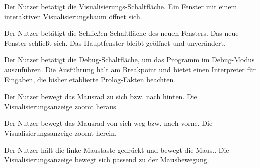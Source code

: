 \documentclass[parskip=full,11pt,twoside]{scrartcl}
\begin{document}


{Der Nutzer betätigt die Visualisierungs-Schaltfläche.}
{Ein Fenster mit einem interaktiven Visualisierungsbaum öffnet sich.}

{Der Nutzer betätigt die Schließen-Schaltfläche des neuen Fensters.}
{Das neue Fenster schließt sich. Das Hauptfenster bleibt geöffnet und unverändert.}




{Der Nutzer betätigt die Debug-Schaltfläche, um das Programm im Debug-Modus auszuführen.}
{Die Ausführung hält am Breakpoint und bietet einen Interpreter für Eingaben, die bisher etablierte Prolog-Fakten beachten.}



{Der Nutzer bewegt das Mausrad zu sich bzw. nach hinten.}
{Die Visualisierungsanzeige zoomt heraus.}

{Der Nutzer bewegt das Mausrad von sich weg bzw. nach vorne.}
{Die Visualisierungsanzeige zoomt herein.}

{Der Nutzer hält die linke Maustaste gedrückt und bewegt die Maus..}
{Die Visualisierungsanzeige bewegt sich passend zu der Mausbewegung.}



\end{document}
